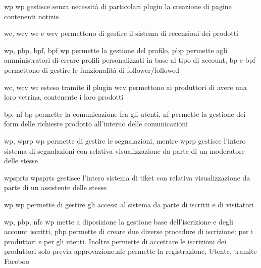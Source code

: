 
{\acrlong{wp}}
{\acrlong{wp} gestisce senza necessità di particolari plugin la creazione di pagine contenenti notizie}


{\acrlong{wc}, \acrlong{wcv}}
{\acrlong{wc} e \acrlong{wcv} permettono di gestire il sistema di recensioni dei prodotti}


{\acrlong{wp}, \acrlong{pbp}, \acrlong{bpf}, \acrlong{bpf}}
{\acrlong{wp} permette la gestione del profilo, \acrlong{pbp} permette agli amministratori di creare profili personalizzati in base al tipo di account, \acrlong{bp} e \acrlong{bpf} permettono di gestire le funzionalità di follower/followed}


{\acrlong{wc}, \acrlong{wcv}}
{\acrlong{wc} esteso tramite il plugin \acrlong{wcv} permettono ai produttori di avere una loro vetrina, contenente i loro prodotti}


{\acrlong{bp}, \acrlong{nf}}
{\acrlong{bp} permette la comunicazione fra gli utenti, \acrlong{nf} permette la gestione dei form delle richieste prodotto all'interno delle comunicazioni}



{\acrlong{wp}, \acrlong{wprp}}
{\acrlong{wp} permette di gestire le segnalazioni, mentre \acrlong{wprp} gestisce l'intero sistema di segnalazioni con relativa visualizzazione da parte di un moderatore delle stesse}


{\acrlong{wpsprts}}
{\acrlong{wpsprts} gestisce l'intero sistema di tiket con relativa visualizzazione da parte di un assistente delle stesse}


{\acrlong{wp}}
{\acrlong{wp} permette di gestire gli accessi al sistema da parte di iscritti e di visitatori}


{\acrlong{wp}, \acrlong{pbp}, \acrlong{nfc}}
{\acrlong{wp} mette a diposizione la gestione base dell'iscrizione e degli account iscritti,  \acrlong{pbp} permette di creare due diverse procedure di iscrizione: per i produttori e per gli utenti. Inoltre permette di accettare le iscrizioni dei produttori solo previa approvazione.\acrlong{nfc} permette la registrazione, Utente, tramite Faceboo}

